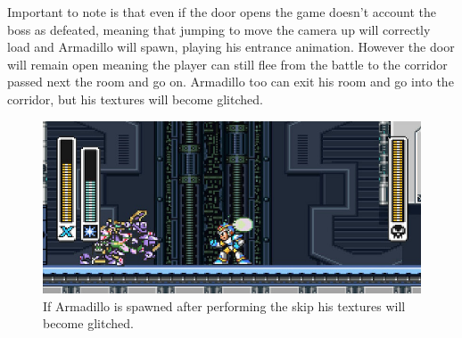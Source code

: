 Important to note is that even if the door opens the game doesn't account the boss as defeated, meaning that jumping to move the camera up will correctly load and Armadillo will spawn, playing his entrance animation. However the door will remain open meaning the player can still flee from the battle to the corridor passed next the room and go on. Armadillo too can exit his room and go into the corridor, but his textures will become glitched.

\begin{figure}[htp]
	\centering
	\includegraphics[width=0.5\linewidth]{figures/X1/Miscs/Dillo_glitch.jpg}
	\caption{If Armadillo is spawned after performing the skip his textures will become glitched.}
\end{figure}


